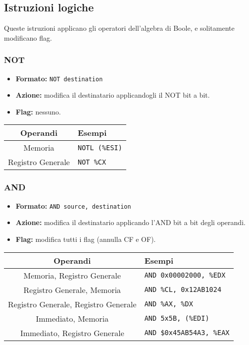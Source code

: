\documentclass[a4paper,11pt]{article}
\begin{document}
\subsection{Istruzioni logiche}
Queste istruzioni applicano gli operatori dell'algebra di Boole, e solitamente modificano flag.

\subsubsection{NOT}
\begin{itemize}
	\item \textbf{Formato:} \texttt{NOT destination}
	\item \textbf{Azione:} modifica il destinatario applicandogli il NOT bit a bit. 
	\item \textbf{Flag:} nessuno. 
\end{itemize}

		\begin{table}[H]
		\center {}
			\begin{tabular} { c | p{5cm} }
				\bfseries Operandi & \bfseries Esempi \\
				\hline
				Memoria & \texttt{NOTL (\%ESI)} \\ 
				Registro Generale & \texttt{NOT \%CX} 
			\end{tabular}
		\end{table}

\subsubsection{AND}
\begin{itemize}
	\item \textbf{Formato:} \texttt{AND source, destination}
	\item \textbf{Azione:} modifica il destinatario applicando l'AND bit a bit degli operandi. 
	\item \textbf{Flag:} modifica tutti i flag (annulla CF e OF).
\end{itemize}

		\begin{table}[H]
		\center {}
			\begin{tabular} { c | p{5cm} }
				\bfseries Operandi & \bfseries Esempi \\
				\hline
				Memoria, Registro Generale & \texttt{AND 0x00002000, \%EDX} \\ 
				Registro Generale, Memoria & \texttt{AND \%CL, 0x12AB1024} \\ 
				Registro Generale, Registro Generale & \texttt{AND \%AX, \%DX} \\ 
				Immediato, Memoria & \texttt{AND 5x5B, (\%EDI)} \\ 
				Immediato, Registro Generale & \texttt{AND \$0x45AB54A3, \%EAX}
			\end{tabular}
		\end{table}
\end{document}
